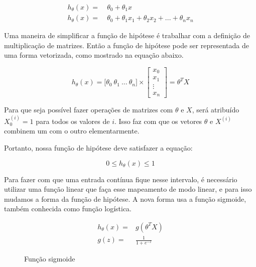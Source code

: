 \begin{align}
h_{\theta}(x) = &\ \theta_0 + \theta_1 x \label{eq:funcaodehipotese} \\
h_{\theta}(x) = &\ \theta_0 + \theta_1 x_1 + \theta_2 x_2 + ... + \theta_n x_n \label{eq:funcaodehipotesegeral}
\end{align}

Uma maneira de simplificar a função de hipótese é trabalhar com a definição de multiplicação de matrizes. Então a função de hipótese pode ser representada de uma forma vetorizada, como mostrado na equação abaixo. 

\begin{equation}
h_{\theta}(x) = \big[\theta_0\ \theta_1\ ...\ \theta_n\big] \times \begin{bmatrix} x_0 \\ x_1 \\ \vdots \\ x_n \end{bmatrix}  = \theta^TX \nonumber
\end{equation}

Para que seja possível fazer operações de matrizes com $\theta$ e $X$, será atribuído $X_0^{(i)} = 1$ para todos os valores de $i$. Isso faz com que os vetores $\theta$ e $X^{(i)}$ combinem um com o outro elementarmente.

Portanto, nossa função de hipótese deve satisfazer a equação:

\begin{equation}
0 \leq h_{\theta}(x) \leq 1 \nonumber
\end{equation}

Para fazer com que uma entrada contínua fique nesse intervalo, é necessário utilizar uma função linear que faça esse mapeamento de modo linear, e para isso mudamos a forma da função de hipótese. A nova forma usa a função sigmoide, também conhecida como função logística.

\begin{align}
h_{\theta}(x) = & g(\theta^TX) \nonumber \\
g(z) = & \frac{1}{1 + e^{-z}} \label{eq:funcaosigmoide}
\end{align}

\begin{figure}[!htb]
  \caption{Função sigmoide}
  \label{fig:funcaosigmoide}
  \begin{center}
  \end{center}
\end{figure}

